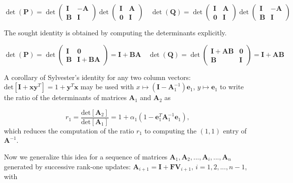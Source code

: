\begin{equation}
\det ( \bm P) = \det
\begin{pmatrix}
\bm I & -\bm A \\
\bm B & \bm I
\end{pmatrix}
\det
\begin{pmatrix}
\bm I & \bm A \\
\bm 0 & \bm I
\end{pmatrix}
\quad
\det (\bm Q) = \det
\begin{pmatrix}
\bm I & \bm A \\
\bm 0 & \bm I
\end{pmatrix}
\det
\begin{pmatrix}
\bm I & -\bm A \\
\bm B & \bm I
\end{pmatrix}
\end{equation}

The sought identity is obtained by computing the determinants explicitly.

\begin{equation}
\det ( \bm P ) = \det
\begin{pmatrix}
\bm I & \bm 0 \\
\bm B & \bm I + \bm B \bm A 
\end{pmatrix}
= \bm I + \bm B \bm A 
\quad
\det ( \bm Q ) = \det
\begin{pmatrix}
\bm I + \bm A \bm B & \bm 0 \\
\bm B & \bm I
\end{pmatrix}
= \bm I + \bm A \bm B
\end{equation}

A corollary of Sylvester's identity for any two column vectors: $\text{det}[\bm I + \bm x \bm y^T] = 1 + \bm y^T \bm x$ may be used with $x \mapsto ( \bm I - \bm A_1^{-1} ) \bm e_1$, $y \mapsto \bm e_1$ to write the ratio of the determinants of matrices $\bm A_1$ and $\bm A_2$ as

\begin{equation}\label{eq:efRatio}
r_1 = \frac{\text{det}[\bm A_2]}{\text{det}[\bm A_1]} = 1 + \alpha_1 ( 1 - \bm e_1^T \bm A_1^{-1} \bm e_1 ) ,
\end{equation}
which reduces the computation of the ratio $r_1$ to computing the $(1,1)$ entry of $\bm A^{-1}$.

Now we generalize this idea for a sequence of matrices $\bm A_1, \bm A_2, ..., \bm A_i, ..., \bm A_n$ generated by successive rank-one updates: $\bm A_{i+1} = \bm I + \bm F \bm V_{i+1}, \, i = 1, 2, ..., n-1$, with

